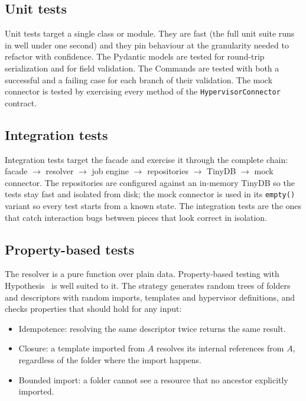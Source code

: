 \subsection{Unit tests}

Unit tests target a single class or module. They are fast (the full
unit suite runs in well under one second) and they pin behaviour at
the granularity needed to refactor with confidence. The Pydantic
models are tested for round-trip serialization and for field
validation. The Commands are tested with both a successful and a
failing case for each branch of their validation. The mock
connector is tested by exercising every method of the
\texttt{HypervisorConnector} contract.

\subsection{Integration tests}

Integration tests target the facade and exercise it through the
complete chain: facade $\to$ resolver $\to$ job engine $\to$
repositories $\to$ TinyDB $\to$ mock connector. The repositories
are configured against an in-memory TinyDB so the tests stay fast
and isolated from disk; the mock connector is used in its
\texttt{empty()} variant so every test starts from a known state.
The integration tests are the ones that catch interaction bugs
between pieces that look correct in isolation.

\subsection{Property-based tests}

The resolver is a pure function over plain data. Property-based
testing with Hypothesis~\cite{hypothesis-docs} is well suited to it.
The strategy generates random trees of folders and descriptors with
random imports, templates and hypervisor definitions, and checks
properties that should hold for any input:

\begin{itemize}
  \item Idempotence: resolving the same descriptor twice returns
        the same result.
  \item Closure: a template imported from $A$ resolves its internal
        references from $A$, regardless of the folder where the
        import happens.
  \item Bounded import: a folder cannot see a resource that no
        ancestor explicitly imported.
\end{itemize}

